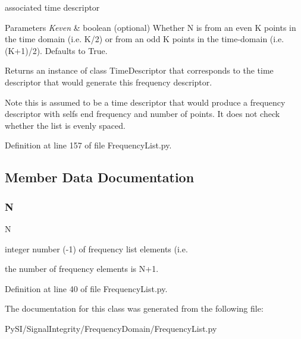 associated time descriptor 


\begin{DoxyParams}{Parameters}
{\em Keven} & boolean (optional) Whether N is from an even K points in the time domain (i.\+e. K/2) or from an odd K points in the time-\/domain (i.\+e. (K+1)/2). Defaults to True. \\
\hline
\end{DoxyParams}
\begin{DoxyReturn}{Returns}
an instance of class Time\+Descriptor that corresponds to the time descriptor that would generate this frequency descriptor. 
\end{DoxyReturn}
\begin{DoxyNote}{Note}
this is assumed to be a time descriptor that would produce a frequency descriptor with self\textquotesingle{}s end frequency and number of points. It does not check whether the list is evenly spaced. 
\end{DoxyNote}


Definition at line 157 of file Frequency\+List.\+py.



\subsection{Member Data Documentation}
\mbox{\label{classSignalIntegrity_1_1FrequencyDomain_1_1FrequencyList_1_1FrequencyList_a8cc2e7240164328fdc3f0e5e21032c56}} 
\subsubsection{\texorpdfstring{N}{N}}
{\footnotesize\ttfamily N}



integer number (-\/1) of frequency list elements (i.\+e. 

the number of frequency elements is N+1. 

Definition at line 40 of file Frequency\+List.\+py.



The documentation for this class was generated from the following file\+:\begin{DoxyCompactItemize}
\item 
Py\+S\+I/\+Signal\+Integrity/\+Frequency\+Domain/Frequency\+List.\+py\end{DoxyCompactItemize}
